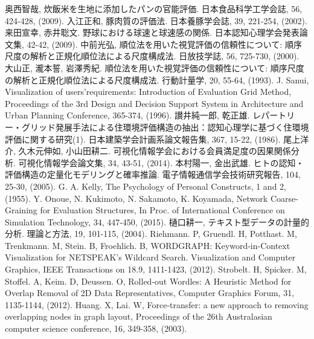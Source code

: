 \documentclass[syuuron]{kuee}
\begin{document}


\begin{thebibliography}{数字}
	 奥西智哉, 炊飯米を生地に添加したパンの官能評価. 日本食品科学工学会誌, 56, 424-428, (2009).
	 入江正和, 豚肉質の評価法. 日本養豚学会誌, 39, 221-254, (2002).
	 来田宣幸, 赤井聡文. 野球における球速と球速感の関係. 日本認知心理学会発表論文集, 42-42, (2009).
	 中前光弘, 順位法を用いた視覚評価の信頼性について: 順序尺度の解析と正規化順位法による尺度構成法. 日放技学誌, 56, 725-730, (2000).
	 大山正, 瀧本誓, 岩澤秀紀. 順位法を用いた視覚評価の信頼性について: 順序尺度の解析と正規化順位法による尺度構成法. 行動計量学, 20, 55-64, (1993).
	 J. Sanui, Visualization of users’requirements: Introduction of Evaluation Grid Method, Proceedings of the 3rd Design and Decision Support System in Architecture and Urban Planning Conference, 365-374, (1996).
	 讃井純一郎, 乾正雄. レパートリー・グリッド発展手法による住環境評価構造の抽出：認知心理学に基づく住環境評価に関する研究(1). 日本建築学会計画系論文報告集, 367, 15-22, (1986).
	 尾上洋介, 久木元伸如, 小山田耕二. 可視化情報学会における会員満足度の因果関係分析. 可視化情報学会論文集, 34, 43-51, (2014).
	 本村陽一, 金出武雄. ヒトの認知・評価構造の定量化モデリングと確率推論. 電子情報通信学会技術研究報告, 104, 25-30, (2005).
	 G. A. Kelly, The Psychology of Personal Constructs, 1 and 2, (1955).
	 Y. Onoue, N. Kukimoto, N. Sakamoto, K. Koyamada, Network Coarse-Graining for Evaluation Structures, In Proc. of International Conference on Simulation Technology, 34, 447-450, (2015). 
	 樋口耕一, テキスト型データの計量的分析. 理論と方法, 19, 101-115, (2004).
	 Riehmann. P, Gruendl. H, Potthast. M, Trenkmann. M, Stein. B, Froehlich. B, WORDGRAPH: Keyword-in-Context Visualization for NETSPEAK's Wildcard Search. Visualization and Computer Graphics, IEEE Transactions on 18.9, 1411-1423, (2012).
	 Strobelt. H, Spicker. M, Stoffel. A, Keim. D, Deussen. O, Rolled‐out Wordles: A Heuristic Method for Overlap Removal of 2D Data Representatives, Computer Graphics Forum, 31, 1135-1144, (2012).
	 Huang. X, Lai. W, Force-transfer: a new approach to removing overlapping nodes in graph layout, Proceedings of the 26th Australasian computer science conference, 16, 349-358, (2003).

\end{thebibliography}
\end{document}
